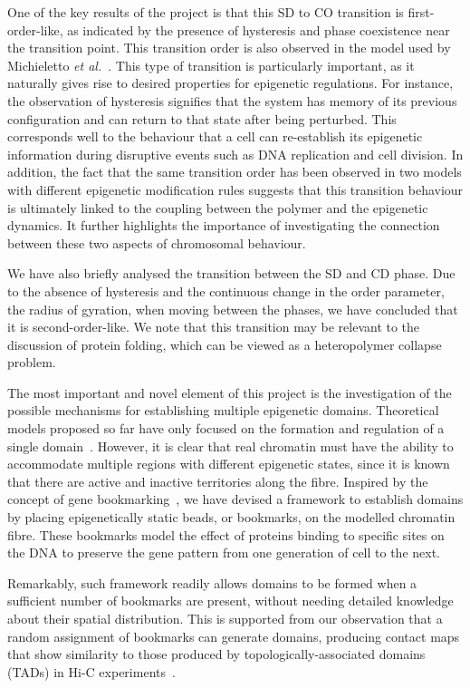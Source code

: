 \documentclass[12pt]{article}
\newcommand{\etal}{\emph{et al.}}
\begin{document}
One of the key results of the project is that this SD to CO transition is first-order-like, as indicated by the presence of hysteresis and phase coexistence near the transition point. This transition order is also observed in the model used by Michieletto \etal~\cite{michieletto2016}. This type of transition is particularly important, as it naturally gives rise to desired properties for epigenetic regulations. For instance, the observation of hysteresis signifies that the system has memory of its previous configuration and can return to that state after being perturbed. This corresponds well to the behaviour that a cell can re-establish its epigenetic information during disruptive events such as DNA replication and cell division. In addition, the fact that the same transition order has been observed in two models with different epigenetic modification rules suggests that this transition behaviour is ultimately linked to the coupling between the polymer and the epigenetic dynamics. It further highlights the importance of investigating the connection between these two aspects of chromosomal behaviour. 

We have also briefly analysed the transition between the SD and CD phase. Due to the absence of hysteresis and the continuous change in the order parameter, the radius of gyration, when moving between the phases, we have concluded that it is second-order-like. We note that this transition may be relevant to the discussion of protein folding, which can be viewed as a heteropolymer collapse problem.

The most important and novel element of this project is the investigation of the possible mechanisms for establishing multiple epigenetic domains. Theoretical models proposed so far have only focused on the formation and regulation of a single domain~\cite{dodd2007, sneppen2008, hathaway2012, zhang2014, jost2014, michieletto2016}. However, it is clear that real chromatin must have the ability to accommodate multiple regions with different epigenetic states, since it is known that there are active and inactive territories along the fibre. Inspired by the concept of gene bookmarking~\cite{sarge2005}, we have devised a framework to establish domains by placing epigenetically static beads, or bookmarks, on the modelled chromatin fibre. These bookmarks model the effect of proteins binding to specific sites on the DNA to preserve the gene pattern from one generation of cell to the next. 

Remarkably, such framework readily allows domains to be formed when a sufficient number of bookmarks are present, without needing detailed knowledge about their spatial distribution. This is supported from our observation that a random assignment of bookmarks can generate domains, producing contact maps that show similarity to those produced by topologically-associated domains (TADs) in Hi-C experiments~\cite{aiden2009, dixon2012}. 
\end{document}
